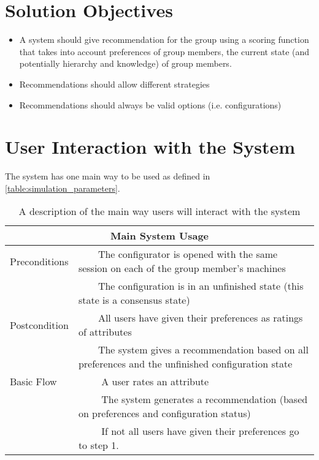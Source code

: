 \documentclass{article}
\newcommand{\tabitem}[1][\textbullet]{~~\llap{#1}~~}
\begin{document}
\section{Solution Objectives}

\begin{itemize}
    \item A system should give recommendation for the group using a scoring function that takes into account preferences of group members, the current state (and potentially hierarchy and knowledge)  of group members.
    \item Recommendations should allow different strategies
    \item Recommendations should always be valid options (i.e. configurations)
\end{itemize}

\section{User Interaction with the System}
The system has one main way to be used as defined in \autoref{table:simulation_parameters}.

\begin{table}
    \begin{center}
        \begin{tabularx}{\columnwidth}{l|X}
            \multicolumn{2}{c}{Main System Usage} \\
            \hline
            Preconditions   & \tabitem The configurator is opened with the same session on each of the group member's machines \\
                            & \tabitem The configuration is in an unfinished state (this state is a consensus state)\\
            \hline
            Postcondition   & \tabitem All users have given their preferences as ratings of attributes \\
                            & \tabitem The system gives a recommendation based on all preferences and the unfinished configuration state \\
            \hline
            Basic Flow      & \tabitem[1.] A user rates an attribute \\
                            & \tabitem[2.] The system generates a recommendation (based on preferences and configuration status) \\
                            & \tabitem[3.] If not all users have given their preferences go to step 1. \\
            \hline
        \end{tabularx}
        \caption{A description of the main way users will interact with the system}
        \label{table:simulation_parameters}
    \end{center}
\end{table}
\end{document}
